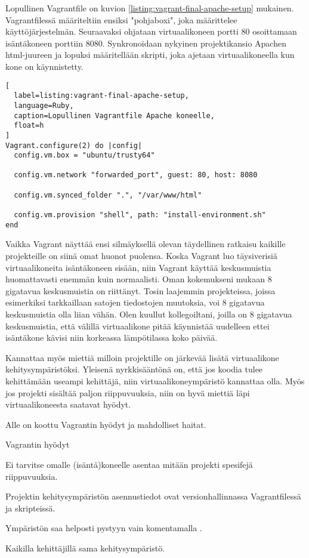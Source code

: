 Lopullinen Vagrantfile on kuvion \ref{listing:vagrant-final-apache-setup} mukainen. Vagrantfilessä määriteltiin ensiksi "pohjaboxi", joka määrittelee käyttöjärjestelmän. Seuraavaksi ohjataan virtuaalikoneen portti 80 osoittamaan isäntäkoneen porttiin 8080. Synkronoidaan nykyinen projektikansio Apachen html-juureen ja lopuksi määritellään skripti, joka ajetaan virtuaalikoneella kun kone on käynnistetty.

\begin{lstlisting}[
  label=listing:vagrant-final-apache-setup,
  language=Ruby,
  caption=Lopullinen Vagrantfile Apache koneelle,
  float=h
]
Vagrant.configure(2) do |config|
  config.vm.box = "ubuntu/trusty64"

  config.vm.network "forwarded_port", guest: 80, host: 8080

  config.vm.synced_folder ".", "/var/www/html"

  config.vm.provision "shell", path: "install-environment.sh"
end
\end{lstlisting}


Vaikka Vagrant näyttää ensi silmäyksellä olevan täydellinen ratkaisu kaikille projekteille on siinä omat huonot puolensa. Koska Vagrant luo täysiverisiä virtuaalikoneita isäntäkoneen sisään, niin Vagrant käyttää keskusmuistia huomattavasti enemmän kuin normaalisti. Oman kokemukseni mukaan 8 gigatavua keskusmuistia on riittänyt. Tosin laajemmin projekteissa, joissa esimerkiksi tarkkaillaan satojen tiedostojen muutoksia, voi 8 gigatavua keskusmuistia olla liian vähän. Olen kuullut kollegoiltani, joilla on 8 gigatavua keskusmuistia, että välillä virtuaalikone pitää käynnistää uudelleen ettei isäntäkone kävisi niin korkeassa lämpötilassa koko päivää.

Kannattaa myös miettiä milloin projektille on järkevää lisätä virtuaalikone kehitysympäristöksi. Yleisenä nyrkkisääntönä on, että jos koodia tulee kehittämään useampi kehittäjä, niin virtuaalikoneympäristö kannattaa olla. Myös jos projekti sisältää paljon riippuvuuksia, niin on hyvä miettiä läpi virtuaalikoneesta saatavat hyödyt.

Alle on koottu Vagrantin hyödyt ja mahdolliset haitat.

Vagrantin hyödyt
\begin{bullet-list}
  \item Ei tarvitse omalle (isäntä)koneelle asentaa mitään projekti spesifejä riippuvuuksia.
  \item Projektin kehitysympäristön asennustiedot ovat versionhallinnassa Vagrantfilessä ja skripteissä.
  \item Ympäristön saa helposti pystyyn vain komentamalla .
  \item Kaikilla kehittäjillä sama kehitysympäristö.
\end{bullet-list}

